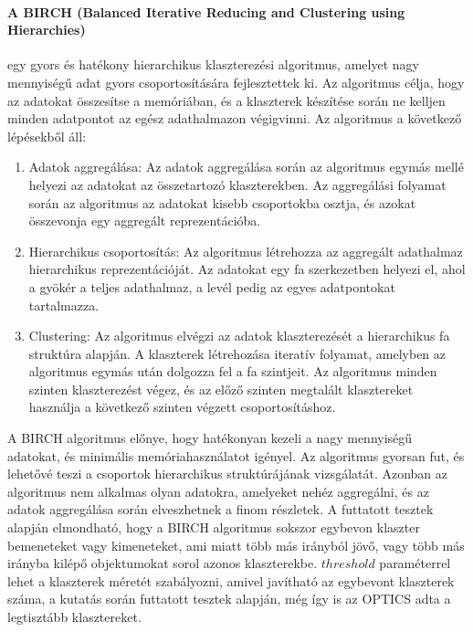 \documentclass[12pt,a4paper]{article}
\begin{document}
\paragraph{A BIRCH (Balanced Iterative Reducing and Clustering using Hierarchies)}  egy gyors és hatékony hierarchikus klaszterezési algoritmus, amelyet nagy mennyiségű adat gyors csoportosítására fejlesztettek ki. Az algoritmus célja, hogy az adatokat összesítse a memóriában, és a klaszterek készítése során ne kelljen minden adatpontot az egész adathalmazon végigvinni.
Az algoritmus a következő lépésekből áll:
\begin{enumerate}
    \item Adatok aggregálása: Az adatok aggregálása során az algoritmus egymás mellé helyezi az adatokat az összetartozó klaszterekben. Az aggregálási folyamat során az algoritmus az adatokat kisebb csoportokba osztja, és azokat összevonja egy aggregált reprezentációba.
    \item Hierarchikus csoportosítás: Az algoritmus létrehozza az aggregált adathalmaz hierarchikus reprezentációját. Az adatokat egy fa szerkezetben helyezi el, ahol a gyökér a teljes adathalmaz, a levél pedig az egyes adatpontokat tartalmazza.
    \item Clustering: Az algoritmus elvégzi az adatok klaszterezését a hierarchikus fa struktúra alapján. A klaszterek létrehozása iteratív folyamat, amelyben az algoritmus egymás után dolgozza fel a fa szintjeit. Az algoritmus minden szinten klaszterezést végez, és az előző szinten megtalált klasztereket használja a következő szinten végzett csoportosításhoz.
\end{enumerate}
A BIRCH algoritmus előnye, hogy hatékonyan kezeli a nagy mennyiségű adatokat, és minimális memóriahasználatot igényel. Az algoritmus gyorsan fut, és lehetővé teszi a csoportok hierarchikus struktúrájának vizsgálatát. Azonban az algoritmus nem alkalmas olyan adatokra, amelyeket nehéz aggregálni, és az adatok aggregálása során elveszhetnek a finom részletek.
A futtatott tesztek alapján elmondható, hogy a BIRCH algoritmus sokszor egybevon klaszter bemeneteket vagy kimeneteket, ami miatt több más irányból jövő, vagy több más irányba kilépő objektumokat sorol azonos klaszterekbe.
\begin{math}threshold\end{math} paraméterrel lehet a klaszterek méretét szabályozni, amivel javítható az egybevont klaszterek száma, a kutatás során futtatott tesztek alapján, még így is az OPTICS adta a legtisztább klasztereket.
\end{document}
